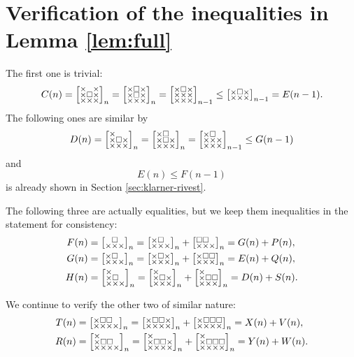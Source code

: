 \documentclass[a4paper,12pt]{article}
\makeatletter
\newenvironment{grid}
  {\begingroup\footnotesize
   \renewcommand{\arraystretch}{0}
   \setlength{\arraycolsep}{0pt}
   \left[\begin{array}{@{}*{10}{c}@{}}}
  {\end{array}\right]\endgroup}
\newcommand{\void}{\phantom{\times}}
\newcommand{\myC}{
    \begin{grid}
        \times & \void & \times \\
        \times & \square & \times \\
        \times & \times & \times
    \end{grid}
}
\newcommand{\myD}{
    \begin{grid}
        \times & \void & \void \\
        \times & \square & \times \\
	\times & \times & \times
    \end{grid}
}
\newcommand{\myE}{
    \begin{grid}
        \times & \square & \times \\
        \times & \times & \times
    \end{grid}
}
\newcommand{\myF}{
    \begin{grid}
        \void & \square & \void \\
        \times & \times & \times
    \end{grid}
}
\newcommand{\myG}{
    \begin{grid}
        \times & \square & \void \\
        \times & \times & \times
    \end{grid}
}
\newcommand{\myH}{
    \begin{grid}
        \times & \void & \void \\
        \times & \square & \void \\
        \times & \times & \times
    \end{grid}
}
\newcommand{\myP}{
    \begin{grid}
        \square & \square & \void \\
        \times & \times & \times
    \end{grid}
}
\newcommand{\myQ}{
    \begin{grid}
        \times & \square & \square \\
        \times & \times & \times
    \end{grid}
}
\newcommand{\myR}{
    \begin{grid}
        \times & \void & \void & \void \\
        \times & \square & \square & \void \\
        \times & \times & \times & \times
    \end{grid}
}
\newcommand{\myS}{
    \begin{grid}
        \times & \void & \void \\
        \times & \square & \square \\
        \times & \times & \times
    \end{grid}
}
\newcommand{\myT}{
    \begin{grid}
        \times & \square & \square & \void \\
        \times & \times & \times & \times
    \end{grid}
}
\newcommand{\myV}{
    \begin{grid}
        \times & \square & \square & \square \\
        \times & \times & \times & \times
    \end{grid}
}
\newcommand{\myW}{
    \begin{grid}
        \times & \void & \void & \void \\
        \times & \square & \square & \square \\
        \times & \times & \times & \times
    \end{grid}
}
\newcommand{\myX}{
    \begin{grid}
        \times & \square & \square & \times \\
        \times & \times & \times & \times
    \end{grid}
}
\newcommand{\myY}{
    \begin{grid}
        \times & \void & \void & \void \\
        \times & \square & \square & \times \\
        \times & \times & \times & \times
    \end{grid}
}
\makeatother
\begin{document}
\section{Verification of the inequalities in Lemma \ref{lem:full}} \label{sec:verification}
	The first one is trivial:
	\[
		C(n) = \myC_n = \begin{grid}
        \times & \square & \times \\
        \times & \square & \times \\
        \times & \times & \times
    \end{grid}_n =  \begin{grid}
        \times & \square & \times \\
        \times & \times & \times \\
        \times & \times & \times
		\end{grid}_{n-1} \le \begin{grid}
        \times & \square & \times \\
        \times & \times & \times \\
		\end{grid}_{n-1} = E(n-1). \\
	\]
	The following ones are similar by
	\[
		D(n) = \myD_n = \begin{grid}
        \times & \square & \void \\
        \times & \square & \times \\
	\times & \times & \times
    \end{grid}_n =  \begin{grid}
        \times & \square & \void \\
        \times & \times & \times \\
	\times & \times & \times
		\end{grid}_{n-1} \le G(n-1)
	\]
	and
	\[
		E(n) \le F(n-1)
	\]
	is already shown in Section \ref{sec:klarner-rivest}.

	The following three are actually equalities, but we keep them inequalities in the statement for consistency:
	\begin{align*}
		F(n) &= \myF_n = \myG_n + \myP_n = G(n) + P(n), \\
		G(n) &= \myG_n = \myE_n + \myQ_n = E(n) + Q(n), \\
		H(n) &= \myH_n = \myD_n + \myS_n = D(n) + S(n).
	\end{align*}

	We continue to verify the other two of similar nature:
	\begin{align*}
		T(n) &= \myT_n = \myX_n + \myV_n = X(n) + V(n), \\
		R(n) &= \myR_n = \myY_n + \myW_n = Y(n) + W(n).
	\end{align*}
\end{document}
